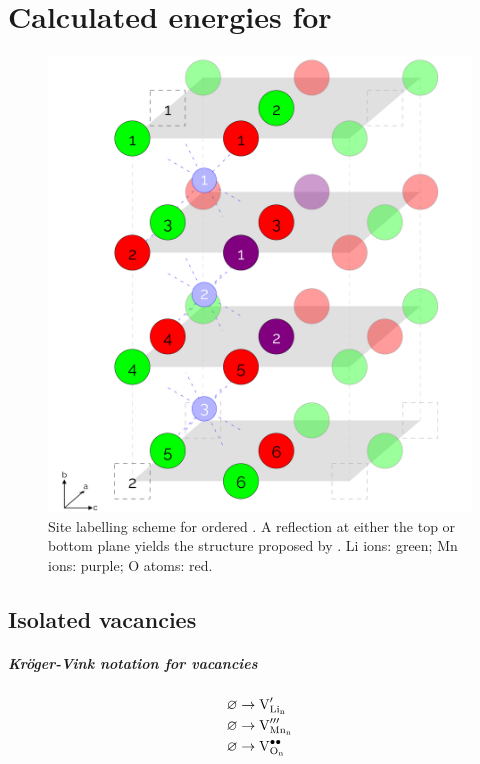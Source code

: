 \chapter{Calculated energies for }

\begin{figure}[h]
\centering
\includegraphics[height = 0.5\textheight]{figures/orderedlabels/orderedlabels}
\caption[Repetition of Figure \ref{fig:orderedlabel} for convenience]{Site labelling scheme for ordered . A reflection at either the top or bottom plane yields the structure proposed by \citet{Diaz-Lopez2017}. Li ions: green; Mn ions: purple; O atoms: red.
}
\end{figure}

\newpage
\section{Isolated vacancies}
\paragraph{Kr\"oger-Vink notation for  vacancies}

\begin{align}
\varnothing &\rightarrow \ce{V^\prime_{Li_n}}\\
\varnothing &\rightarrow \ce{V^{\prime \prime \prime}_{Mn_n}}\\
\varnothing &\rightarrow \ce{V^{\bullet\bullet}_{O_n}}
\end{align}

